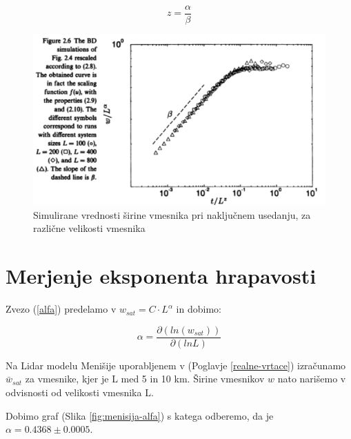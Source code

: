 \documentclass[a4paper, oneside, 12pt]{book}
\begin{document}
            \begin{equation}
              z = \frac{\alpha}{\beta}
            \end{equation}

            \begin{figure}[H]
              \begin{center}
                \includegraphics[width=13cm]{slike/barabasi}
              \end{center}
              \caption{Simulirane vrednosti širine vmesnika pri naključnem usedanju, za različne velikosti vmesnika \cite{barabasi1995fractal}}
              \label{fig:barabasi}
            \end{figure}



            \section{Merjenje eksponenta hrapavosti}
            \label{hrapavost}

            Zvezo (\ref{alfa}) predelamo  v $ w_{sat}=C \cdot L^\alpha $ in dobimo:

            \begin{equation}
              \alpha = \frac{\partial ( ln (w_{sat}) ) }{\partial ( ln L )}
              \label{alpha-numeric}
            \end{equation}

            Na Lidar modelu Menišije uporabljenem v (Poglavje \ref{realne-vrtace}) izračunamo $\bar{w}_{sat}$ za vmesnike, kjer je L med 5 in 10 km. Širine vmesnikov $w$ nato narišemo v odvisnosti od velikosti vmesnika L.

            Dobimo graf (Slika \ref{fig:menisija-alfa}) s katega odberemo, da je $\alpha =  0.4368 \pm 0.0005$.
\end{document}

